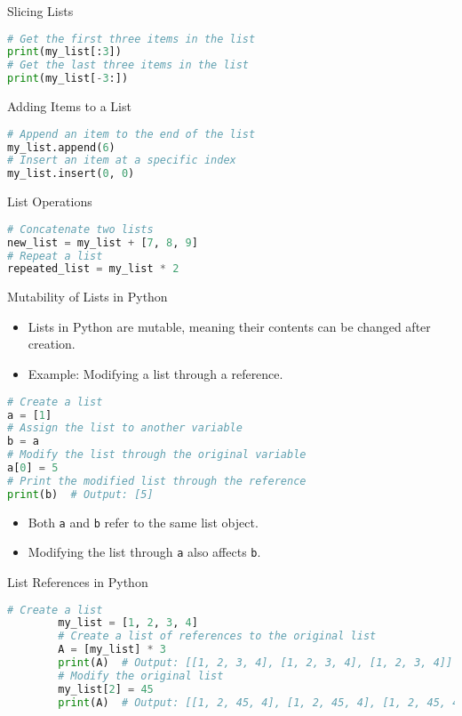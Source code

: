 \begin{frame}[fragile]{Slicing Lists}
    \begin{lstlisting}[style=colorful, language=Python]
# Get the first three items in the list
print(my_list[:3])
# Get the last three items in the list
print(my_list[-3:])
    \end{lstlisting}
\end{frame}             


\begin{frame}[fragile]{Adding Items to a List}
    \begin{lstlisting}[style=colorful, language=Python]
# Append an item to the end of the list
my_list.append(6)
# Insert an item at a specific index
my_list.insert(0, 0)
    \end{lstlisting}
\end{frame}     


\begin{frame}[fragile]{List Operations}
    \begin{lstlisting}[style=colorful, language=Python]
# Concatenate two lists
new_list = my_list + [7, 8, 9]
# Repeat a list
repeated_list = my_list * 2
    \end{lstlisting}
\end{frame}

\begin{frame}[fragile]{Mutability of Lists in Python}
    \begin{itemize}
        \item Lists in Python are mutable, meaning their contents can be changed after creation.
        \item Example: Modifying a list through a reference.
    \end{itemize}
    \begin{lstlisting}[style=colorful, language=Python]
# Create a list
a = [1]
# Assign the list to another variable
b = a
# Modify the list through the original variable
a[0] = 5
# Print the modified list through the reference
print(b)  # Output: [5]
    \end{lstlisting}
    \begin{itemize}
        \item Both \texttt{a} and \texttt{b} refer to the same list object.
        \item Modifying the list through \texttt{a} also affects \texttt{b}.
    \end{itemize}
\end{frame}

\begin{frame}[fragile]{List References in Python}
    \begin{lstlisting}[style=colorful, language=Python]
        # Create a list
        my_list = [1, 2, 3, 4]
        # Create a list of references to the original list
        A = [my_list] * 3
        print(A)  # Output: [[1, 2, 3, 4], [1, 2, 3, 4], [1, 2, 3, 4]]
        # Modify the original list
        my_list[2] = 45
        print(A)  # Output: [[1, 2, 45, 4], [1, 2, 45, 4], [1, 2, 45, 4]]
    \end{lstlisting}
\end{frame}


